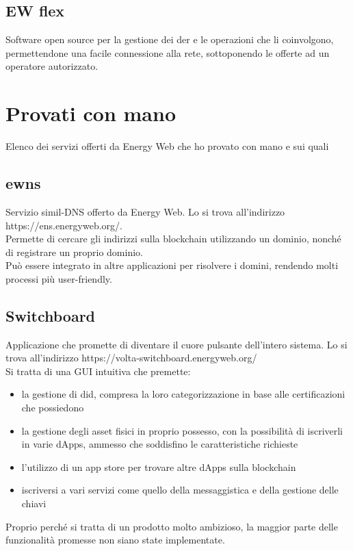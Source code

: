 \documentclass[12pt, letterpaper, twoside]{article}
\begin{document}
\subsection{EW flex}
Software open source per la gestione dei \gls{der} e le operazioni che li coinvolgono, permettendone una facile connessione alla rete, sottoponendo le offerte ad un operatore autorizzato.

\newpage

\section{Provati con mano}
Elenco dei servizi offerti da Energy Web che ho provato con mano e sui quali 

\subsection{\gls{ewns}}
Servizio simil-DNS offerto da Energy Web. Lo si trova all'indirizzo https://ens.energyweb.org/.\\
Permette di cercare gli indirizzi sulla blockchain utilizzando un dominio, nonché di registrare un proprio dominio.\\
Può essere integrato in altre applicazioni per risolvere i domini, rendendo molti processi più user-friendly.

\subsection{Switchboard}
Applicazione che promette di diventare il cuore pulsante dell'intero sistema. Lo si trova all'indirizzo https://volta-switchboard.energyweb.org/ \\
Si tratta di una GUI intuitiva che premette:
\begin{itemize}
    \item la gestione di \gls{did}, compresa la loro categorizzazione in base alle certificazioni che possiedono
    \item la gestione degli asset fisici in proprio possesso, con la possibilità di iscriverli in varie dApps, ammesso che soddisfino le caratteristiche richieste
    \item l'utilizzo di un app store per trovare altre dApps sulla blockchain
    \item iscriversi a vari servizi come quello della messaggistica e della gestione delle chiavi
\end{itemize}
Proprio perché si tratta di un prodotto molto ambizioso, la maggior parte delle funzionalità promesse non siano state implementate.
\end{document}
